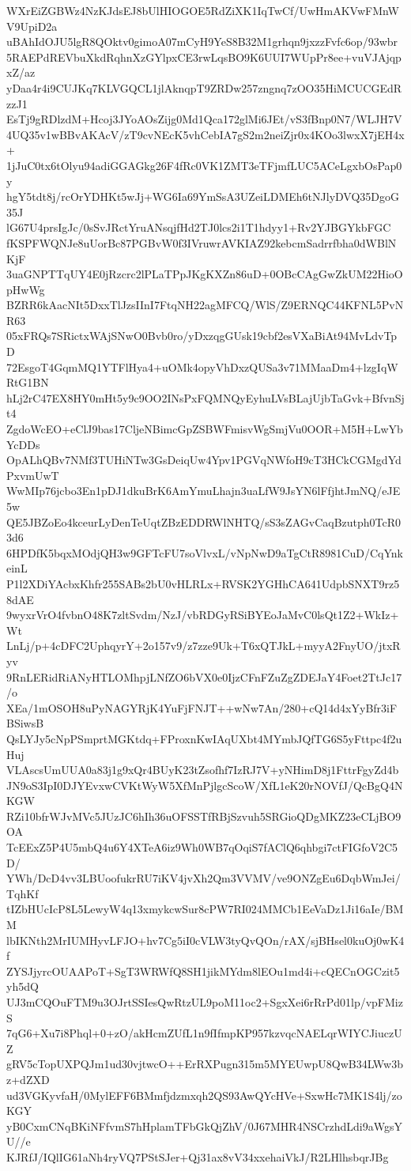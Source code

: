 WXrEiZGBWz4NzKJdsEJ8bUlHIOGOE5RdZiXK1IqTwCf/UwHmAKVwFMnWV9UpiD2a
uBAhIdOJU5lgR8QOktv0gimoA07mCyH9YeS8B32M1grhqn9jxzzFvfc6op/93wbr
5RAEPdREVbuXkdRqhnXzGYlpxCE3rwLqsBO9K6UUI7WUpPr8ee+vuVJAjqpxZ/az
yDaa4r4i9CUJKq7KLVGQCL1jlAknqpT9ZRDw257zngnq7zOO35HiMCUCGEdRzzJ1
EsTj9gRDlzdM+Hcoj3JYoAOsZijg0Md1Qca172glMi6JEt/vS3fBnp0N7/WLJH7V
4UQ35v1wBBvAKAcV/zT9cvNEcK5vhCebIA7gS2m2neiZjr0x4KOo3lwxX7jEH4x+
1jJuC0tx6tOlyu94adiGGAGkg26F4fRc0VK1ZMT3eTFjmfLUC5ACeLgxbOsPap0y
hgY5tdt8j/rcOrYDHKt5wJj+WG6Ia69YmSsA3UZeiLDMEh6tNJlyDVQ35DgoG35J
lG67U4prsIgJc/0sSvJRctYruANsqjfHd2TJ0lcs2i1T1hdyy1+Rv2YJBGYkbFGC
fKSPFWQNJe8uUorBc87PGBvW0f3IVruwrAVKIAZ92kebcmSadrrfbha0dWBlNKjF
3uaGNPTTqUY4E0jRzcrc2lPLaTPpJKgKXZn86uD+0OBcCAgGwZkUM22HioOpHwWg
BZRR6kAacNIt5DxxTlJzsIInI7FtqNH22agMFCQ/WlS/Z9ERNQC44KFNL5PvNR63
05xFRQs7SRictxWAjSNwO0Bvb0ro/yDxzqgGUsk19cbf2esVXaBiAt94MvLdvTpD
72EsgoT4GqmMQ1YTFlHya4+uOMk4opyVhDxzQUSa3v71MMaaDm4+lzgIqWRtG1BN
hLj2rC47EX8HY0mHt5y9c9OO2INsPxFQMNQyEyhuLVsBLajUjbTaGvk+BfvnSjt4
ZgdoWcEO+eClJ9bas17CljeNBimcGpZSBWFmisvWgSmjVu0OOR+M5H+LwYbYcDDs
OpALhQBv7NMf3TUHiNTw3GsDeiqUw4Ypv1PGVqNWfoH9cT3HCkCGMgdYdPxvmUwT
WwMIp76jcbo3En1pDJ1dkuBrK6AmYmuLhajn3uaLfW9JsYN6lFfjhtJmNQ/eJE5w
QE5JBZoEo4kceurLyDenTeUqtZBzEDDRWlNHTQ/sS3sZAGvCaqBzutph0TcR03d6
6HPDfK5bqxMOdjQH3w9GFTcFU7soVlvxL/vNpNwD9aTgCtR8981CuD/CqYnkeinL
P1l2XDiYAcbxKhfr255SABs2bU0vHLRLx+RVSK2YGHhCA641UdpbSNXT9rz58dAE
9wyxrVrO4fvbnO48K7zltSvdm/NzJ/vbRDGyRSiBYEoJaMvC0lsQt1Z2+WkIz+Wt
LnLj/p+4cDFC2UphqyrY+2o157v9/z7zze9Uk+T6xQTJkL+myyA2FnyUO/jtxRyv
9RnLERidRiANyHTLOMhpjLNfZO6bVX0e0IjzCFnFZuZgZDEJaY4Foet2TtJc17/o
XEa/1mOSOH8uPyNAGYRjK4YuFjFNJT++wNw7An/280+cQ14d4xYyBfr3iFBSiwsB
QsLYJy5cNpPSmprtMGKtdq+FProxnKwIAqUXbt4MYmbJQfTG6S5yFttpc4f2uHuj
VLAscsUmUUA0a83j1g9xQr4BUyK23tZsofhf7IzRJ7V+yNHimD8j1FttrFgyZd4b
JN9oS3IpI0DJYEvxwCVKtWyW5XfMnPjlgcScoW/XfL1eK20rNOVfJ/QcBgQ4NKGW
RZi10bfrWJvMVc5JUzJC6hIh36uOFSSTfRBjSzvuh5SRGioQDgMKZ23eCLjBO9OA
TcEExZ5P4U5mbQ4u6Y4XTeA6iz9Wh0WB7qOqiS7fAClQ6qhbgi7ctFIGfoV2C5D/
YWh/DcD4vv3LBUoofukrRU7iKV4jvXh2Qm3VVMV/ve9ONZgEu6DqbWmJei/TqhKf
tIZbHUcIcP8L5LewyW4q13xmykcwSur8cPW7RI024MMCb1EeVaDz1Ji16aIe/BMM
lbIKNth2MrIUMHyvLFJO+hv7Cg5iI0cVLW3tyQvQOn/rAX/sjBHsel0kuOj0wK4f
ZYSJjyrcOUAAPoT+SgT3WRWfQ8SH1jikMYdm8lEOu1md4i+cQECnOGCzit5yh5dQ
UJ3mCQOuFTM9u3OJrtSSIesQwRtzUL9poM11oc2+SgxXei6rRrPd01lp/vpFMizS
7qG6+Xu7i8Phql+0+zO/akHcmZUfL1n9fIfmpKP957kzvqcNAELqrWIYCJiuczUZ
gRV5cTopUXPQJm1ud30vjtwcO++ErRXPugn315m5MYEUwpU8QwB34LWw3bz+dZXD
ud3VGKyvfaH/0MylEFF6BMmfjdzmxqh2QS93AwQYcHVe+SxwHc7MK1S4lj/zoKGY
yB0CxmCNqBKiNFfvmS7hHplamTFbGkQjZhV/0J67MHR4NSCrzhdLdi9aWgsYU//e
KJRfJ/IQlIG61aNh4ryVQ7PStSJer+Qj31ax8vV34xxehaiVkJ/R2LHlhsbqrJBg
